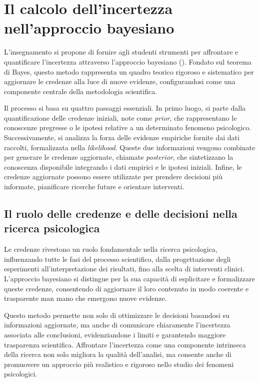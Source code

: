 \documentclass[
  letterpaper,
  DIV=11,
  numbers=noendperiod]{scrreprt}
\theoremstyle{definition}
\theoremstyle{remark}
\begin{document}
\section{Il calcolo dell'incertezza nell'approccio
bayesiano}\label{il-calcolo-dellincertezza-nellapproccio-bayesiano}

L'insegnamento si propone di fornire agli studenti strumenti per
affrontare e quantificare l'incertezza attraverso l'approccio bayesiano
(). Fondato sul
teorema di Bayes, questo metodo rappresenta un quadro teorico rigoroso e
sistematico per aggiornare le credenze alla luce di nuove evidenze,
configurandosi come una componente centrale della metodologia
scientifica.

Il processo si basa su quattro passaggi essenziali. In primo luogo, si
parte dalla quantificazione delle credenze iniziali, note come
\emph{prior}, che rappresentano le conoscenze pregresse o le ipotesi
relative a un determinato fenomeno psicologico. Successivamente, si
analizza la forza delle evidenze empiriche fornite dai dati raccolti,
formalizzata nella \emph{likelihood}. Queste due informazioni vengono
combinate per generare le credenze aggiornate, chiamate
\emph{posterior}, che sintetizzano la conoscenza disponibile integrando
i dati empirici e le ipotesi iniziali. Infine, le credenze aggiornate
possono essere utilizzate per prendere decisioni più informate,
pianificare ricerche future e orientare interventi.

\subsection{Il ruolo delle credenze e delle decisioni nella ricerca
psicologica}\label{il-ruolo-delle-credenze-e-delle-decisioni-nella-ricerca-psicologica}

Le credenze rivestono un ruolo fondamentale nella ricerca psicologica,
influenzando tutte le fasi del processo scientifico, dalla progettazione
degli esperimenti all'interpretazione dei risultati, fino alla scelta di
interventi clinici. L'approccio bayesiano si distingue per la sua
capacità di esplicitare e formalizzare queste credenze, consentendo di
aggiornare il loro contenuto in modo coerente e trasparente man mano che
emergono nuove evidenze.

Questo metodo permette non solo di ottimizzare le decisioni basandosi su
informazioni aggiornate, ma anche di comunicare chiaramente l'incertezza
associata alle conclusioni, evidenziandone i limiti e garantendo
maggiore trasparenza scientifica. Affrontare l'incertezza come una
componente intrinseca della ricerca non solo migliora la qualità
dell'analisi, ma consente anche di promuovere un approccio più
realistico e rigoroso nello studio dei fenomeni psicologici.
\end{document}
